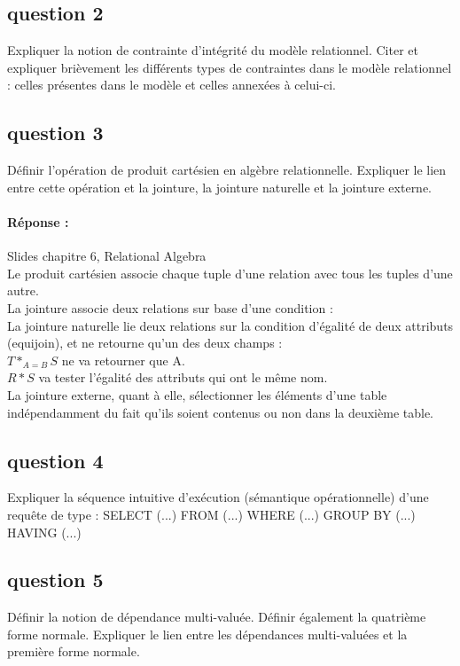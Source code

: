 \subsection{question 2}
Expliquer la notion de contrainte d’intégrité du modèle relationnel. Citer et expliquer brièvement
les différents types de contraintes dans le modèle relationnel : celles présentes dans le modèle
et celles annexées à celui-ci.

\subsection{question 3}

Définir l’opération de produit cartésien en algèbre relationnelle. Expliquer le lien entre cette
opération et la jointure, la jointure naturelle et la jointure externe.

\paragraph{Réponse :} Slides chapitre 6, Relational Algebra\\
Le produit cartésien associe chaque tuple d'une relation avec 
tous les tuples d'une autre. \\
La jointure associe deux relations sur base d'une condition : \\
La jointure naturelle lie deux relations sur la condition d'égalité de deux 
attributs (equijoin), et ne retourne qu'un des deux champs :\\
$T*_{A=B}S$ ne va retourner que A. \\
$R*S$ va tester l'égalité des attributs qui ont le même nom.\\

La jointure externe, quant à elle, sélectionner les éléments d'une table 
indépendamment du fait qu'ils soient contenus ou non dans la deuxième table. 




\subsection{question 4}
Expliquer la séquence intuitive d’exécution (sémantique opérationnelle) d’une requête de type :
SELECT (...) FROM (...) WHERE (...) GROUP BY (...) HAVING (...)

\subsection{question 5}
Définir la notion de dépendance multi-valuée. Définir également la quatrième forme normale.
Expliquer le lien entre les dépendances multi-valuées et la première forme normale.


